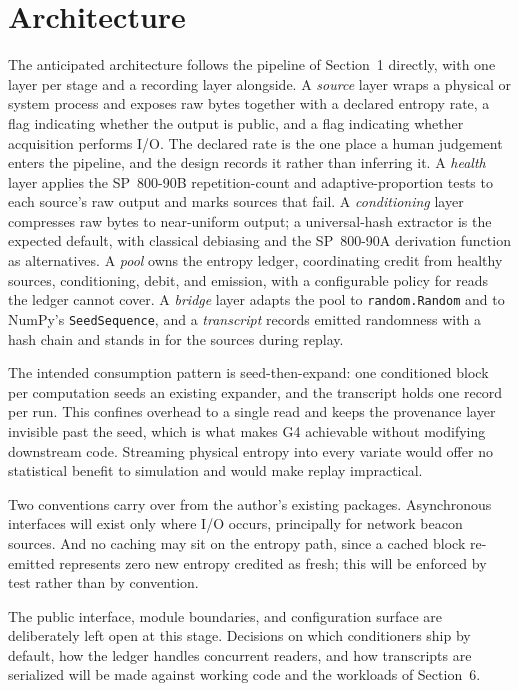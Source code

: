 \section{Architecture}
 
The anticipated architecture follows the pipeline of Section~1 directly, with one
layer per stage and a recording layer alongside. A \emph{source} layer wraps a physical
or system process and exposes raw bytes together with a declared entropy rate, a flag
indicating whether the output is public, and a flag indicating whether acquisition
performs I/O. The declared rate is the one place a human judgement enters the pipeline,
and the design records it rather than inferring it. A \emph{health} layer applies the
SP~800-90B repetition-count and adaptive-proportion tests to each source's raw output
and marks sources that fail. A \emph{conditioning} layer compresses raw bytes to
near-uniform output; a universal-hash extractor is the expected default, with classical
debiasing and the SP~800-90A derivation function as alternatives. A \emph{pool} owns
the entropy ledger, coordinating credit from healthy sources, conditioning, debit, and
emission, with a configurable policy for reads the ledger cannot cover. A
\emph{bridge} layer adapts the pool to \texttt{random.Random} and to NumPy's
\texttt{SeedSequence}, and a \emph{transcript} records emitted randomness with a hash
chain and stands in for the sources during replay.
 
The intended consumption pattern is seed-then-expand: one conditioned block per
computation seeds an existing expander, and the transcript holds one record per run.
This confines overhead to a single read and keeps the provenance layer invisible past
the seed, which is what makes G4 achievable without modifying downstream code. Streaming
physical entropy into every variate would offer no statistical benefit to simulation and
would make replay impractical.
 
Two conventions carry over from the author's existing packages. Asynchronous interfaces
will exist only where I/O occurs, principally for network beacon sources. And no caching
may sit on the entropy path, since a cached block re-emitted represents zero new entropy
credited as fresh; this will be enforced by test rather than by convention.
 
The public interface, module boundaries, and configuration surface are deliberately
left open at this stage. Decisions on which conditioners ship by default, how the
ledger handles concurrent readers, and how transcripts are serialized will be made
against working code and the workloads of Section~6.